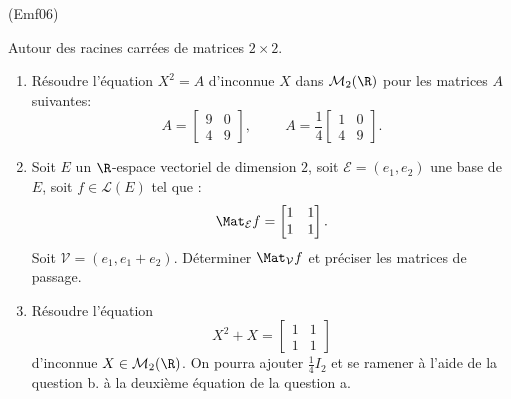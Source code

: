 \begin{tiny}(Emf06)\end{tiny}
Autour des racines carrées de matrices $2\times 2$.
\begin{enumerate}
 \item Résoudre l'équation $X^2 = A$ d'inconnue $X$ dans $\mathcal{M}_2(\R)$ pour les matrices $A$ suivantes:
\[
 A=
\begin{bmatrix}
 9 & 0 \\
 4 & 9
\end{bmatrix}
, \hspace{1cm} 
 A=\frac{1}{4}
\begin{bmatrix}
 1 & 0 \\
 4 & 9
\end{bmatrix}.
\]
\item Soit $E$ un $\R$-espace vectoriel de dimension $2$, soit $\mathcal E =(e_1,e_2)$ une base de $E$, soit $f\in \mathcal{L}(E)$ tel que  :
\[
 \Mat_{\mathcal E} f=
\begin{bmatrix}
 1 & 1 \\
1 & 1
\end{bmatrix}.
 \]
Soit $\mathcal V=(e_1,e_1+e_2)$. Déterminer $\Mat_{\mathcal V} f$ et préciser les matrices de passage.

\item R{\'e}soudre l'{\'e}quation 
\begin{displaymath}
 X^2 + X = \begin{bmatrix}
 1 & 1 \\
1 & 1
\end{bmatrix}
\end{displaymath}
d'inconnue $X\in\mathcal M_2(\R)$. On pourra ajouter $\frac{1}{4}I_2$ et se ramener à l'aide de la question b. à la deuxième équation de la question a.
\end{enumerate}
